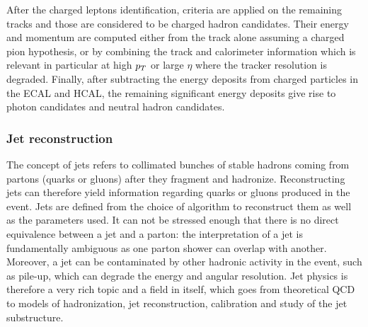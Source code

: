     After the charged leptons identification, criteria are applied on the
    remaining tracks and those are considered to be charged hadron candidates.
    Their energy and momentum are computed either from the track alone assuming
    a charged pion hypothesis, or by combining the track and calorimeter
    information which is relevant in particular at high $p_T$ or large $\eta$
    where the tracker resolution is degraded. Finally, after subtracting the
    energy deposits from charged particles in the ECAL and HCAL, the remaining
    significant energy deposits give rise to photon candidates and neutral
    hadron candidates.

    \subsubsection{Jet reconstruction \label{sec:jetReconstruction}}

    The concept of jets refers to collimated bunches of stable hadrons coming
    from partons (quarks or gluons) after they fragment and hadronize.
    Reconstructing jets can therefore yield information regarding quarks or
    gluons produced in the event.  Jets are defined from the choice of algorithm
    to reconstruct them as well as the parameters used. It can not be stressed
    enough that there is no direct equivalence between a jet and a parton: the
    interpretation of a jet is fundamentally ambiguous as one parton shower can
    overlap with another. Moreover, a jet can be contaminated by other hadronic
    activity in the event, such as pile-up, which can degrade the energy and
    angular resolution. Jet physics is therefore a very rich topic and a field
    in itself, which goes from theoretical QCD to models of hadronization, jet
    reconstruction, calibration and study of the jet substructure.

